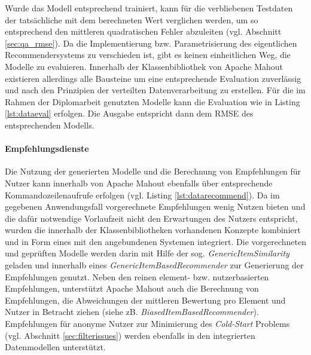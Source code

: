 

Wurde das Modell entsprechend trainiert, kann für die verbliebenen Testdaten der tatsächliche mit dem berechneten Wert verglichen werden, um so entsprechend den mittleren quadratischen Fehler abzuleiten (vgl. Abschnitt \ref{sec:qa_rmse}). Da die Implementierung bzw. Parametrisierung des eigentlichen Recommendersystems zu verschieden ist, gibt es keinen einheitlichen Weg, die Modelle zu evaluieren. Innerhalb der Klassenbibliothek von Apache Mahout existieren allerdings alle Bausteine um eine entsprechende Evaluation zuverlässig und nach den Prinzipien der verteilten Datenverarbeitung zu erstellen. Für die im Rahmen der Diplomarbeit genutzten Modelle kann die Evaluation wie in Listing \ref{lst:dataeval}  erfolgen. Die Ausgabe entspricht dann dem \acs{RMSE} des entsprechenden Modells. \citep{mia}

 

\paragraph{Empfehlungsdienste} Die Nutzung der generierten Modelle und die Berechnung von Empfehlungen für Nutzer kann innerhalb von Apache Mahout ebenfalls über entsprechende Kommandozeilenaufrufe erfolgen (vgl. Listing \ref{lst:datarecommend}). Da im gegebenen Anwendungsfall vorgerechnete Empfehlungen wenig Nutzen bieten und die dafür notwendige Vorlaufzeit nicht den Erwartungen des Nutzers entspricht, wurden die innerhalb der Klassenbibliotheken vorhandenen Konzepte kombiniert und in Form eines  mit den angebundenen Systemen integriert. Die vorgerechneten und geprüften Modelle werden darin mit Hilfe der sog. \textit{GenericItemSimilarity} geladen und innerhalb eines \textit{GenericItemBasedRecommender} zur Generierung der Empfehlungen genutzt. Neben den reinen element- bzw. nutzerbasierten Empfehlungen, unterstützt Apache Mahout auch die Berechnung von Empfehlungen, die Abweichungen der mittleren Bewertung pro Element und Nutzer in Betracht ziehen (siehe zB. \textit{BiasedItemBasedRecommender}). Empfehlungen für anonyme Nutzer zur Minimierung des \textit{Cold-Start} Problems (vgl. Abschnitt \ref{sec:filterissues}) werden ebenfalls in den integrierten Datenmodellen unterstützt. %

